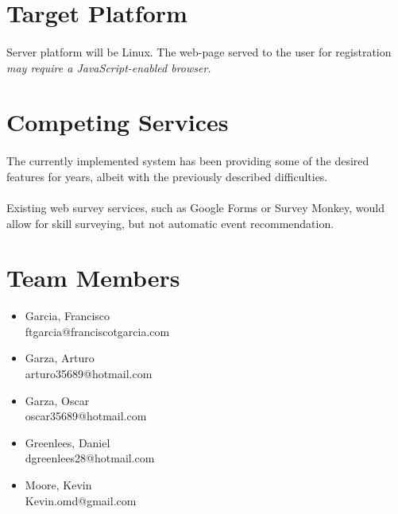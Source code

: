 \documentclass[a4paper]{article}
\begin{document}
\section{Target Platform}
\paragraph{} Server platform will be Linux. The web-page served to the user for registration \em may \em require a JavaScript-enabled browser.

\section{Competing Services}
\paragraph{} The currently implemented system has been providing some of the desired features for years, albeit with the previously described difficulties.

\paragraph{} Existing web survey services, such as Google Forms or Survey Monkey, would allow for skill surveying, but not automatic event recommendation.	

\section{Team Members}
	\begin{itemize}
		\item Garcia, Francisco\\ ftgarcia@franciscotgarcia.com
		\item Garza, Arturo\\ arturo35689@hotmail.com
		\item Garza, Oscar\\ oscar35689@hotmail.com
		\item Greenlees, Daniel\\ dgreenlees28@hotmail.com
		\item Moore, Kevin\\ Kevin.omd@gmail.com
	\end{itemize}
\end{document}
